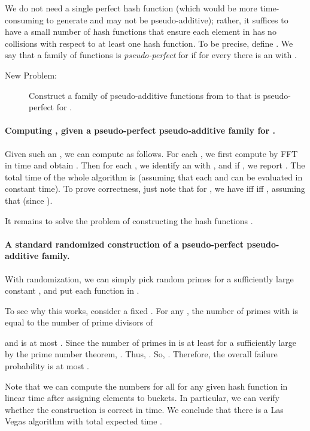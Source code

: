 \documentclass[11pt]{article}
\begin{document}
{\newcommand{\collide}{\textrm{collide}}
\newcommand{\HH}{{\cal H}}

We do not need a single perfect hash function (which would be
more time-consuming to generate and may not be pseudo-additive); rather,
it suffices to have a small number
of hash functions that ensure each element in  has no collisions
with respect to at least one hash function.  To be precise,
define .
We say that
a family  of functions is \emph{pseudo-perfect} for 
if for every  there is an  with .
\begin{description}
\item[New Problem:] Construct a family  of  pseudo-additive functions from  to  that is pseudo-perfect for .
\end{description}

\paragraph{Computing , given a pseudo-perfect pseudo-additive family for .}

\newcommand{\hh}{\hat{h}}
Given such an , we can compute  as follows.
For each , we first compute  by FFT in
 time and obtain .
Then for each , we identify an
 with , and if , we report .
The total time of the whole algorithm is 
(assuming that each  and  can be evaluated in constant time).
To prove correctness, just note that
for , we have
 iff  iff ,
assuming that  (since ).


It remains to solve the problem of constructing the hash functions .

\paragraph{A standard randomized construction of
a pseudo-perfect pseudo-additive family.}
With randomization, we can simply pick  random primes  for a sufficiently large constant ,
and put each function  in .

To see why this works, consider a fixed .
For any , the number of primes  with  is equal to the number of prime divisors of

and is at most .  Since the number of primes in 
is at least  for a sufficiently large  by the
prime number theorem, .
Thus, .
So, .  Therefore, the overall failure probability is at most .

Note that we can compute the numbers
 for all  for any given hash function
in linear time after assigning elements to buckets.
In particular, we can verify whether the
construction is correct in  time.
We conclude that there is a Las Vegas algorithm with total expected time  .

}
\end{document}
